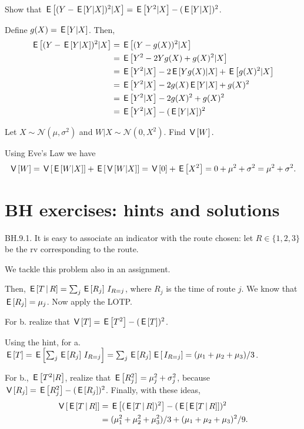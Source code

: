 \begin{exercise}
Show that $\E{(Y - \E{Y |X})^2|X} = \E{Y^2|X} - (\E{Y |X})^2$.

\begin{solution}
Define $g(X) = \E{Y|X}$. Then,
\begin{align}
    \E{(Y - \E{Y |X})^2|X}&= \E{(Y - g(X))^2|X}\\
    &=\E{Y^2-2Yg(X)+g(X)^2|X}\\
    &=\E{Y^2|X}-2\E{Yg(X)|X}+\E{g(X)^2|X}\\
    &=\E{Y^2|X}-2g(X)\E{Y|X}+g(X)^2\\
    &=\E{Y^2|X}-2g(X)^2+g(X)^2\\
    &=\E{Y^2|X}-(\E{Y |X})^2
\end{align}
\end{solution}
\end{exercise}


\begin{exercise}
Let $X\sim \mathcal{N}(\mu,\sigma^2)$ and $W|X \sim \mathcal{N}(0,X^2)$. Find $\V{W}.$

\begin{solution}
Using Eve's Law we have
\begin{align}
    \V{W} = \V{\E{W|X}}+\E{\V{W|X}} =\V{0} + \E{X^2} = 0+  \mu^2 + \sigma^2 = \mu^2 + \sigma^2.
\end{align}

\end{solution}
\end{exercise}


\section{BH exercises: hints and solutions}

\begin{exercise}BH.9.1. It is easy to associate an indicator with the route chosen:  let $R\in \{1,2,3\}$ be the rv corresponding to the route.

We tackle this problem also in an assignment.

\begin{hint}
Then, $\E{T\given R} = \sum_j \E{R_j} \1{R=j}$, where $R_j$ is the time of route $j$. We know that $\E{R_j} = \mu_j$. Now apply the LOTP.

For b.  realize that $\V T = \E{T^{2}} - (\E T)^2$.

\end{hint}
\begin{solution}
Using the hint, for a. $\E T = \E{\sum_j \E{R_j} \1{R=j}} = \sum_j \E{R_j} \E{\1{R=j}} = (\mu_{1}+\mu_2+\mu_3)/3$.

For b.,  $\E{T^2|R}$, realize that $\E{R_j^2} = \mu_j^2+\sigma_j^2$, because $\V{R_j} = \E{R_j^2}-(\E{R_j})^2$.
Finally, with these ideas,
\begin{align*}
\V{\E{T\given R}}
&= \E{ (\E{T\given R})^{2}} - (\E{\E{T\given R}})^{2} \\
&= (\mu_1^2+\mu_2^2+\mu_{3}^2)/3 + (\mu_1+\mu_2+\mu_3)^2/9.
\end{align*}
\end{solution}
\end{exercise}

